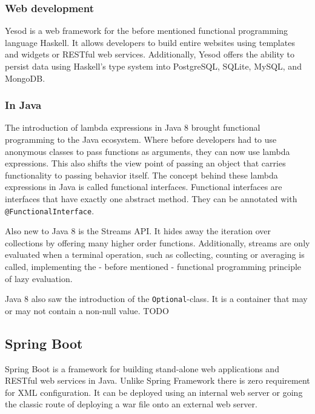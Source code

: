\documentclass[a4paper,titlepage]{article}
\begin{document}
\subsubsection{Web development}

Yesod is a web framework for the before mentioned functional programming
language Haskell. It allows developers to build entire websites using templates
and widgets or RESTful web services. Additionally, Yesod offers the ability to
persist data using Haskell's type system into PostgreSQL, SQLite, MySQL, and
MongoDB. \cite{snoyman2015developing}

\subsubsection{In Java}

The introduction of lambda expressions in Java 8 brought functional programming
to the Java ecosystem. Where before developers had to use anonymous classes to
pass functions as arguments, they can now use lambda expressions. This also
shifts the view point of passing an object that carries functionality to passing
behavior itself. The concept behind these lambda expressions in Java is called
functional interfaces. Functional interfaces are interfaces that have exactly
one abstract method. They can be annotated with \verb|@FunctionalInterface|.
\newline

\noindent Also new to Java 8 is the Streams API. It hides away the iteration
over collections by offering many higher order functions. Additionally, streams
are only evaluated when a terminal operation, such as collecting, counting or
averaging is called, implementing the - before mentioned - functional
programming principle of lazy evaluation. \cite{warburton2014java}

Java 8 also saw the introduction of the \verb|Optional|-class. It is a container
that may or may not contain a non-null value. TODO

\subsection{Spring Boot}

Spring Boot is a framework for building stand-alone web applications and RESTful
web services in Java. Unlike Spring Framework there is zero requirement for XML
configuration. It can be deployed using an internal web server or going the
classic route of deploying a war file onto an external web server.
\cite{webb2013spring}
\end{document}
